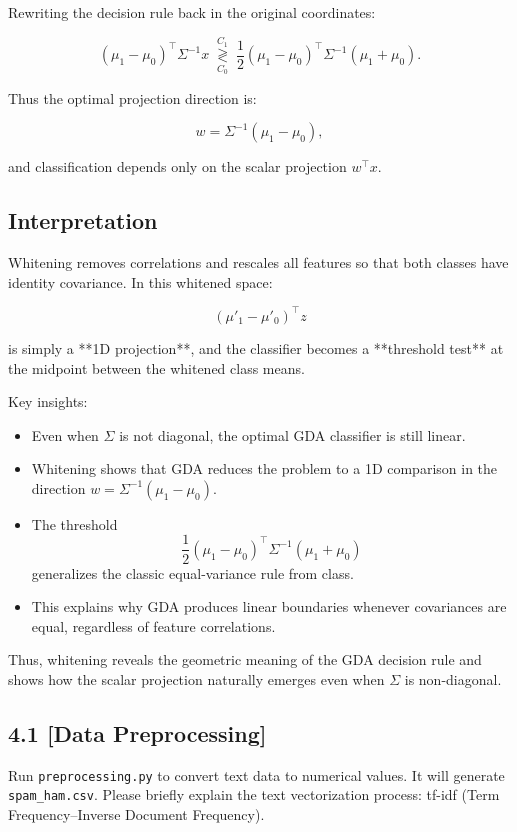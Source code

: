 \documentclass[12pt]{article}
\begin{document}
Rewriting the decision rule back in the original coordinates:

\[
(\mu_1 - \mu_0)^\top \Sigma^{-1} x 
\;\underset{C_0}{\overset{C_1}{\gtrless}}\;
\frac{1}{2}
(\mu_1 - \mu_0)^\top 
\Sigma^{-1} (\mu_1 + \mu_0).
\]

Thus the optimal projection direction is:

\[
w = \Sigma^{-1}(\mu_1 - \mu_0),
\]

and classification depends only on the scalar projection \( w^\top x \).

\subsection*{Interpretation}

Whitening removes correlations and rescales all features so that both classes have
identity covariance. In this whitened space:

\[
(\mu'_1 - \mu'_0)^\top z
\]

is simply a **1D projection**, and the classifier becomes a **threshold test** at the midpoint
between the whitened class means.

Key insights:

\begin{itemize}
    \item Even when $\Sigma$ is not diagonal, the optimal GDA classifier is still linear.
    \item Whitening shows that GDA reduces the problem to a 1D comparison in the direction
          $w = \Sigma^{-1}(\mu_1 - \mu_0)$.
    \item The threshold 
    \[
    \frac{1}{2}(\mu_1 - \mu_0)^\top \Sigma^{-1}(\mu_1 + \mu_0)
    \]
    generalizes the classic equal-variance rule from class.
    \item This explains why GDA produces linear boundaries whenever covariances are equal,
          regardless of feature correlations.
\end{itemize}

Thus, whitening reveals the geometric meaning of the GDA decision rule and shows how the
scalar projection naturally emerges even when $\Sigma$ is non-diagonal.


\subsection*{4.1 [Data Preprocessing]}
Run \texttt{preprocessing.py} to convert text data to numerical values. It will generate \texttt{spam\_ham.csv}. Please briefly explain the text vectorization process: tf-idf (Term Frequency–Inverse Document Frequency).
\end{document}
